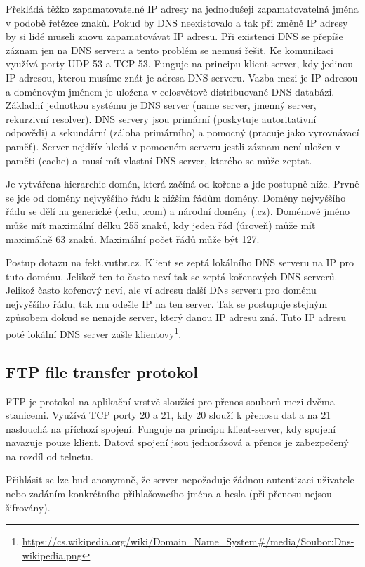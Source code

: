 Překládá těžko zapamatovatelné IP adresy na jednodušeji zapamatovatelná jména v podobě řetězce znaků. Pokud by DNS neexistovalo a tak při změně IP adresy by si lidé museli znovu zapamatovávat IP adresu. Při existenci DNS se přepíše záznam jen na DNS serveru a tento problém se nemusí řešit. Ke komunikaci využívá porty UDP 53 a TCP 53. Funguje na principu klient-server, kdy jedinou IP adresou, kterou musíme znát je adresa DNS serveru. Vazba mezi je IP adresou a doménovým jménem je uložena v celosvětově distribuované DNS databázi. Základní jednotkou systému je DNS server (name server, jmenný server, rekurzivní resolver). DNS servery jsou primární (poskytuje autoritativní odpovědi) a sekundární (záloha primárního) a pomocný (pracuje jako vyrovnávací paměť). Server nejdřív hledá v pomocném serveru jestli záznam není uložen v paměti (cache) a~musí mít vlastní DNS server, kterého se může zeptat.

Je vytvářena hierarchie domén, která začíná od kořene a jde postupně níže. Prvně se jde od domény nejvyššího řádu k nižším řádům domény. Domény nejvyššího řádu se dělí na generické (.edu, .com) a národní domény (.cz). Doménové jméno může mít maximální délku 255 znaků, kdy jeden řád (úroveň) může mít maximálně 63 znaků. Maximální počet řádů může být 127. 

Postup dotazu na fekt.vutbr.cz. Klient se zeptá lokálního DNS serveru na IP pro tuto doménu. Jelikož ten to často neví tak se zeptá kořenových DNS serverů. Jelikož často kořenový neví, ale ví adresu další DNs serveru pro doménu nejvyššího řádu, tak mu odešle IP na ten server. Tak se postupuje stejným způsobem dokud se nenajde server, který danou IP adresu zná. Tuto IP adresu poté lokální DNS server zašle klientovy\footnote{\url{https://cs.wikipedia.org/wiki/Domain_Name_System\#/media/Soubor:Dns-wikipedia.png}}. 

\subsection{FTP file transfer protokol}

FTP je protokol na aplikační vrstvě sloužící pro přenos souborů mezi dvěma stanicemi. Využívá TCP porty 20 a 21, kdy 20 slouží k přenosu dat a na 21 naslouchá na příchozí spojení. Funguje na principu klient-server, kdy spojení navazuje pouze klient. Datová spojení jsou jednorázová a přenos je zabezpečený na rozdíl od telnetu. 

Přihlásit se lze buď anonymně, že server nepožaduje žádnou autentizaci uživatele nebo zadáním konkrétního přihlašovacího jména a hesla (při přenosu nejsou šifrovány).

